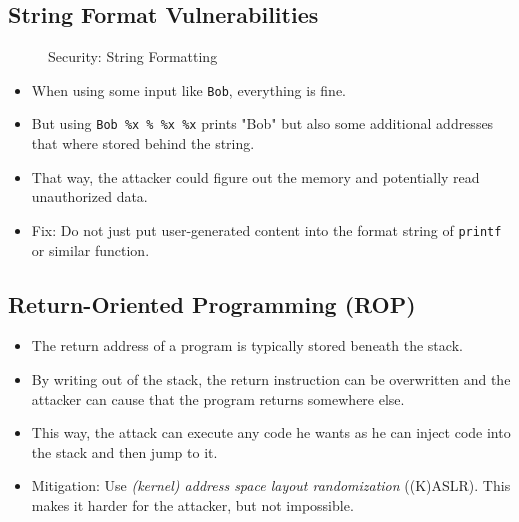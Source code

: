 \documentclass[a4paper, 11pt, accentcolor = tud3b]{tudreport}
\begin{document}
            \subsection{String Format Vulnerabilities}
	            \begin{figure}[H]
	            	\centering
	            	
	            	\caption{Security: String Formatting}
	            \end{figure}
                \begin{itemize}
                	\item When using some input like \texttt{Bob}, everything is fine.
                	\item But using \texttt{Bob \%x \% \%x \%x} prints "Bob" but also some additional addresses that where stored behind the string.
                	\item That way, the attacker could figure out the memory and potentially read unauthorized data.
                	\item Fix: Do not just put user-generated content into the format string of \texttt{printf} or similar function.
                \end{itemize}

            \subsection{Return-Oriented Programming (ROP)}
                \begin{itemize}
                	\item The return address of a program is typically stored beneath the stack.
                	\item By writing out of the stack, the return instruction can be overwritten and the attacker can cause that the program returns somewhere else.
                	\item This way, the attack can execute any code he wants as he can inject code into the stack and then jump to it.
                	\item Mitigation: Use \textit{(kernel) address space layout randomization} ((K)ASLR). This makes it harder for the attacker, but not impossible.
                \end{itemize}
\end{document}

